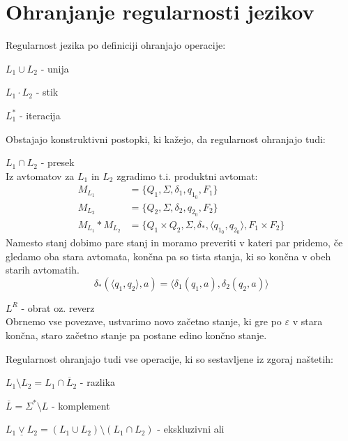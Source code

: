 \documentclass[10pt,a4paper,oneside]{book}
\begin{document}
\section{Ohranjanje regularnosti jezikov}
Regularnost jezika po definiciji ohranjajo operacije:
\begin{items}
\item $L_1 \cup L_2$ - unija 
\item $L_1 \cdot L_2$ - stik 
\item $L_1^*$ - iteracija
\end{items}
Obstajajo konstruktivni postopki, ki kažejo, da regularnost ohranjajo tudi:
\begin{items}
\item $L_1 \cap L_2$ - presek\\
	Iz avtomatov za $L_1$ in $L_2$ zgradimo t.i. produktni avtomat:
		\begin{align*}
			M_{L_1} &= \{ Q_1, \Sigma, \delta_1, q_{1_0}, F_1 \}\\
			M_{L_2} &= \{ Q_2, \Sigma, \delta_2, q_{2_0}, F_2 \}\\
			M_{L_1}*M_{L_2} &= \{ Q_1 \times Q_2, \Sigma, \delta_*, \langle q_{1_0}, q_{2_0} \rangle, F_1 \times F_2 \}
		\end{align*}
	Namesto stanj dobimo pare stanj in moramo preveriti v kateri par pridemo, če gledamo oba stara avtomata, končna pa so tista stanja, ki so končna v obeh starih avtomatih.
	\begin{displaymath}
		\delta_*(\langle q_1, q_2 \rangle, a) = \langle \delta_1(q_1, a), \delta_2(q_2, a)\rangle
	\end{displaymath}
\item $L^R$ - obrat oz. reverz\\
	Obrnemo vse povezave, ustvarimo novo začetno stanje, ki gre po $\varepsilon$ v stara končna, staro začetno stanje pa postane edino končno stanje.
\end{items}
Regularnost ohranjajo tudi vse operacije, ki so sestavljene iz zgoraj naštetih:
\begin{items}
\item $L_1 \setminus L_2 = L_1 \cap \overline L_2$ - razlika
\item $\overline{L} = \Sigma^* \setminus L$ - komplement
\item $L_1 \underline\vee L_2 = (L_1 \cup L_2) \setminus (L_1 \cap L_2)$ - ekskluzivni ali 
\end{items}
\end{document}
